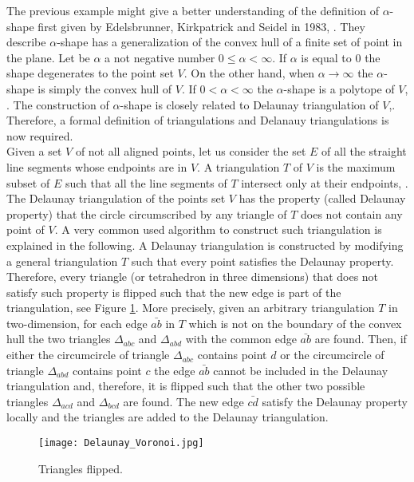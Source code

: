 The previous example might give a better understanding of the definition of $\alpha$-shape first given by Edelsbrunner, Kirkpatrick and Seidel in 1983, \cite{edelsbrunner1983shape}. They describe $\alpha$-shape has a generalization of the convex hull of a finite set of point in the plane. Let be $\alpha$ a not negative number $0\leq\alpha<\infty$. 
If $\alpha$ is equal to $0$ the shape degenerates to the point set $V$. On the other hand, when $\alpha\rightarrow\infty$ the $\alpha$-shape is simply the convex hull of $V$. If $0<\alpha<\infty$ the $\alpha$-shape is a polytope of $V$, \cite{edelsbrunner1994three}. The construction of $\alpha$-shape is closely related to Delaunay triangulation of $V$,\cite{mucke1993shapes}. Therefore, a formal definition of triangulations and Delanauy triangulations is now required. \\ \indent
Given a set $V$ of not all aligned points, let us consider the set $E$ of all the straight line segments whose endpoints are in $V$. 
A triangulation $T$ of $V$ is the maximum subset of $E$ such that all the line segments of $T$ intersect only at their endpoints, \cite{lloyd1977triangulations}. \\ \indent 
The Delaunay triangulation of the points set $V$ has the property (called Delaunay property) that the circle circumscribed by any triangle of $T$ does not contain any point of $V$. A very common used algorithm to construct such triangulation is explained in the following. 
A Delaunay triangulation is constructed by modifying a general triangulation $T$ such that every point satisfies the Delaunay property. 
Therefore, every triangle (or tetrahedron in three dimensions) that does not satisfy such property is flipped such that the new edge is part of the triangulation, see Figure \ref{fig:Delaunay}. 
More precisely, given an arbitrary triangulation $T$ in two-dimension, for each edge $\bar{ab}$ in $T$ which is not on the boundary of the convex hull the two triangles 
$\Delta_{abc}$ and $\Delta_{abd}$ with the common edge $\bar{ab}$ are found. Then, if either the circumcircle of triangle $\Delta_{abc}$ contains point $d$ or the circumcircle of triangle $\Delta_{abd}$ contains point $c$ the edge $\bar{ab}$ cannot be included in the Delaunay triangulation and, therefore, it is flipped such that the other two possible triangles $\Delta_{acd}$ and $\Delta_{bcd}$ are found. The new edge $\bar{cd}$ satisfy the Delaunay property locally and the triangles are added to the Delaunay triangulation.  
\begin{figure}[h]\label{fig:Delaunay}
\begin{center}
\texttt{[image: Delaunay\_Voronoi.jpg]}
\label{fig:shape}
\caption{Triangles flipped.}
\label{fig:Delaunay}
\end{center}
\end{figure}
